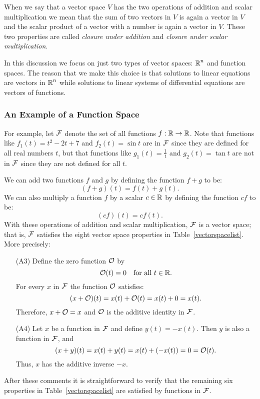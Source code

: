 \documentclass{ximera}
\begin{document}
When we say that a vector space $V$ has the two operations of
addition and scalar multiplication we mean that the sum of two
vectors in $V$ is again a vector in $V$ and the scalar product
of a vector with a number is again a vector in $V$.  These two
properties are called {\em closure under addition\/} and
{\em closure under scalar multiplication}.

In this discussion we focus on just two types of vector spaces:
$\mbox{$\Bbb{R}$}^n$ and function spaces.  The reason that we make this choice
is that solutions to linear equations are vectors in $\mbox{$\Bbb{R}$}^n$ while
solutions to linear systems of differential equations are vectors
of functions.

\subsubsection*{An Example of a Function Space}

For example, let ${\cal F}$ denote the set of all functions $f:\mbox{$\Bbb{R}$}\to\mbox{$\Bbb{R}$}$.
Note that functions like $f_1(t)=t^2-2t+7$ and $f_2(t)=\sin t$ are in
${\cal F}$ since they are defined for all real numbers $t$, but that functions
like $g_1(t)=\frac{1}{t}$ and $g_2(t)=\tan t$ are not in ${\cal F}$ since
they are not defined for all $t$.

We can add two functions $f$ and $g$ by defining the function $f+g$ to be:
\[
(f+g)(t) = f(t) + g(t).
\]
We can also multiply a function $f$ by a scalar $c\in\mbox{$\Bbb{R}$}$ by defining the
function $cf$ to be:
\[
(cf)(t) = cf(t).
\]
With these operations of addition and scalar multiplication, ${\cal F}$
is a vector space; that is, ${\cal F}$ satisfies the eight vector space
properties in Table~\ref{vectorspacelist}.  More precisely:
\begin{itemize}
\item[(A3)] Define the zero function ${\cal O}$ by
\[
     {\cal O}(t) = 0 \quad \mbox{for all $t\in\mbox{$\Bbb{R}$}$.}
\]
For every $x$ in ${\cal F}$ the function ${\cal O}$ satisfies:
\[
     (x+{\cal O})(t) = x(t) + {\cal O}(t) = x(t) + 0 = x(t).
\]
Therefore, $x+{\cal O}=x$ and ${\cal O}$ is the additive
identity in ${\cal F}$.
\item[(A4)] Let $x$ be a function in ${\cal F}$ and define $y(t)=-x(t)$.
Then $y$ is also a function in ${\cal F}$, and
\[
    (x+y)(t) =  x(t) + y(t) = x(t) + (-x(t)) = 0 = {\cal O}(t).
\]
Thus, $x$ has the additive inverse $-x$.
\end{itemize}
After these comments it is straightforward to verify that the
remaining six properties in Table~\ref{vectorspacelist} are
satisfied by functions in ${\cal F}$.
\end{document}
